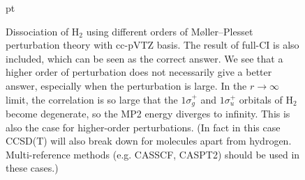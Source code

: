 \documentclass{article}
\theoremstyle{plain}\theoremheaderfont{\normalfont\itshape}\theorembodyfont{\rmfamily}\theoremseparator{.}\newtheorem*{rem}{Remark}\newtheorem*{ex}{Example}\newtheorem*{proof}{Proof}\newtheorem*{altp}{Alternative proof}
\theoremstyle{plain}\theoremheaderfont{\normalfont\bfseries}\theorembodyfont{\rmfamily}\theoremseparator{.}\newtheorem{thm}{Theorem}[section]\newtheorem{lem}[thm]{Lemma}\newtheorem{prop}[thm]{Proposition}\newtheorem*{cor}{Corollary}\newtheorem{defn}[thm]{Definition}\newtheorem{clm}[thm]{Claim}\newtheorem{clminproof}{Claim}
\theoremstyle{break}\theoremheaderfont{\normalfont\itshape}\theorembodyfont{\rmfamily}\theoremseparator{.\medskip}\newtheorem*{proofskip}{Proof}\newtheorem*{exs}{Examples}\newtheorem*{rems}{Remarks}
\theoremstyle{break}\theoremheaderfont{\normalfont\bfseries}\theorembodyfont{\rmfamily}\theoremseparator{.\medskip}\newtheorem{lemskip}[thm]{Lemma}\newtheorem{defnskip}[thm]{Definition}\newtheorem{propskip}[thm]{Proposition}\newtheorem{thmskip}[thm]{Theorem}
\numberwithin{equation}{section}
\begin{document}
    \begin{figure}
        \centering
        
         pt
        \caption{Dissociation of \(\mathrm{H_2}\) using different orders of M\o ller--Plesset perturbation theory with cc-pVTZ basis. The result of full-CI is also included, which can be seen as the correct answer. We see that a higher order of perturbation does not necessarily give a better answer, especially when the perturbation is large. In the \(r\to\infty\) limit, the correlation is so large that the \(1\sigma_g^+\) and \(1\sigma_u^+\) orbitals of \(\mathrm{H_2}\) become degenerate, so the MP2 energy diverges to infinity. This is also the case for higher-order perturbations. (In fact in this case CCSD(T) will also break down for molecules apart from hydrogen. Multi-reference methods (e.g. CASSCF, CASPT2) should be used in these cases.)}
    \end{figure}
\end{document}
